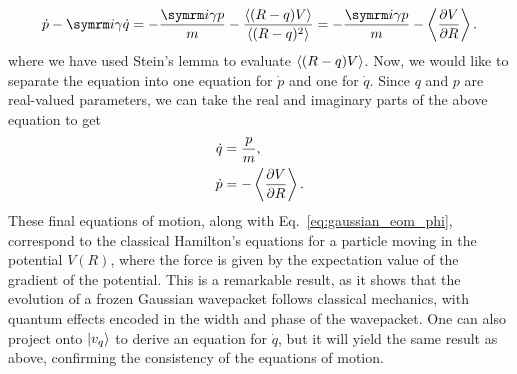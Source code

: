 \begin{equation}
\dot p-\i\gamma\dot q=-\frac{\i\gamma p}{m}-\frac{\braket{(R-q)V}}{\braket{(R-q)^2}}=-\frac{\i\gamma p}{m}-\Braket{\frac{\partial V}{\partial R}}.
\end{equation}
where we have used Stein's lemma to evaluate $\braket{(R-q)V}$. Now, we would like to separate the equation into one equation for $\dot p$ and one for $\dot q$. Since $q$ and $p$ are real-valued parameters, we can take the real and imaginary parts of the above equation to get
\begin{align}
\dot q&=\frac{p}{m},\\
\dot p&=-\Braket{\frac{\partial V}{\partial R}}.
\end{align}
These final equations of motion, along with Eq.~\eqref{eq:gaussian_eom_phi}, correspond to the classical Hamilton's equations for a particle moving in the potential $V(R)$, where the force is given by the expectation value of the gradient of the potential. This is a remarkable result, as it shows that the evolution of a frozen Gaussian wavepacket follows classical mechanics, with quantum effects encoded in the width and phase of the wavepacket. One can also project onto $\ket{v_q}$ to derive an equation for $\dot q$, but it will yield the same result as above, confirming the consistency of the equations of motion.
